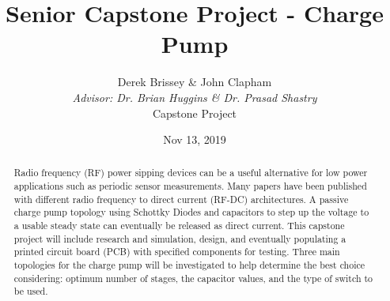\documentclass[12pt]{article}
\title{\textbf{Senior Capstone Project - Charge Pump}}
\author{Derek Brissey \& John Clapham\\ \textit{Advisor: Dr. Brian Huggins \& Dr. Prasad Shastry}\\ Capstone Project}
\date{Nov 13, 2019}
\begin{document}
\begin{titlepage}
\end{titlepage}


	\begin{abstract}
Radio frequency (RF) power sipping devices can be a useful alternative for low power applications such as periodic sensor measurements. Many papers have been published with different radio frequency to direct current (RF-DC) architectures. A passive charge pump topology using Schottky Diodes and capacitors to step up the voltage to a usable steady state can eventually be released as direct current. This capstone project will include research and simulation, design, and eventually populating a printed circuit board (PCB) with specified components for testing. Three main topologies for the charge pump will be investigated to help determine the best choice considering: optimum number of stages, the capacitor values, and the type of switch to be used.
	\end{abstract}
	
\end{document}
